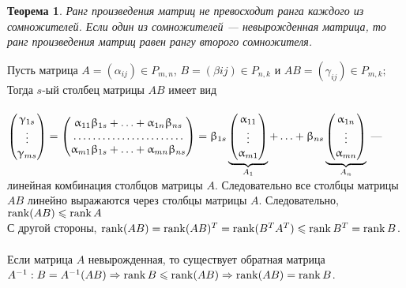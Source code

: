 \newtheorem*{th10_7}{Теорема}\begin{th10_7}Ранг произведения матриц не превосходит ранга каждого из сомножителей. Если один из сомножителей --- невырожденная матрица, то ранг произведения матриц равен рангу второго сомножителя.
\end{th10_7}\begin{Proof}
	Пусть матрица $A = (\alpha_{ij}) \in P_{m,n}$, $B = (\beta{ij}) \in P_{n,k}$ и $AB = (\gamma_{ij}) \in P_{m,k};$ Тогда $s$-ый столбец матрицы $AB$ имеет вид\\\\
	$\begin{pmatrix} \gamma_{1s}
		\\ \vdots
		\\ \gamma_{ms}
	\end{pmatrix} = \begin{pmatrix} 
		\alpha_{11}\beta_{1s} + \ldots + \alpha_{1n}\beta_{ns}
		\\ \dotfill
		\\ \alpha_{m1}\beta_{1s} + \ldots + \alpha_{mn}\beta_{ns}
	\end{pmatrix} = \beta_{1s}\underbrace{\begin{pmatrix} \alpha_{11}
			\\ \vdots
			\\ \alpha_{m1}
	\end{pmatrix}}_{A_1} + \ldots + \beta_{ns}\underbrace{\begin{pmatrix} \alpha_{1n}
			\\ \vdots
			\\ \alpha_{mn}
	\end{pmatrix}}_{A_n}$ --- линейная комбинация столбцов матрицы $A$. Следовательно все столбцы матрицы $AB$ линейно выражаются через столбцы матрицы $A$. Следовательно, $\operatorname{rank} (AB) \leqslant \operatorname{rank} A$\\
	С другой стороны, $\operatorname{rank}  (AB) = \operatorname{rank}  (AB)^T = \operatorname{rank}  (B^T A^T) \leqslant \operatorname{rank}  B^T = \operatorname{rank}  B$.\\\\
	Если матрица $A$ невырожденная, то существует обратная матрица $A^{-1}: B = A^{-1} (AB)\Rightarrow \operatorname{rank}  B \leqslant \operatorname{rank} (AB) \Rightarrow \operatorname{rank} (AB) = \operatorname{rank}  B $.
\end{Proof}


















